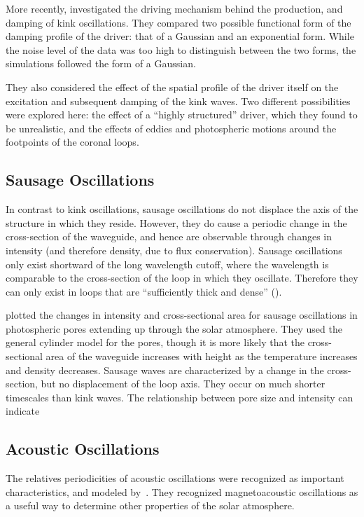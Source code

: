 \documentclass[preprint2]{aastex}
\begin{document}
More recently, \cite{kink_2} investigated the driving mechanism
behind the production, and damping of kink oscillations.
They compared two possible functional form of the damping profile
of the driver: that of a Gaussian and an exponential form.
While the noise level of the data was too high to distinguish
between the two forms, the simulations followed the form of a
Gaussian.

They also considered the effect of the spatial profile of the driver
itself on the excitation and subsequent damping of the kink
waves. Two different possibilities were explored here:
the effect of a ``highly structured'' driver, which they
found to be unrealistic, and the effects of eddies and photospheric
motions around the footpoints of the coronal loops.

\subsection{Sausage Oscillations}\label{sausage}
In contrast to kink oscillations, sausage oscillations do not displace
the axis of the structure in which they reside. However, they do cause
a periodic change in the cross-section of the waveguide, and hence
are observable through changes in intensity (and therefore density,
due to flux conservation). Sausage oscillations only exist shortward
of the long wavelength cutoff, where the wavelength is comparable to
the cross-section of the loop in which they oscillate. Therefore
they can only exist in loops that are ``sufficiently thick and dense''
(\cite{pfw_2}).

\cite{sausage_1} plotted the changes in intensity and cross-sectional
area for sausage oscillations in photospheric pores extending up
through the solar atmosphere. They used the general cylinder model for
the pores, though it is more likely that the cross-sectional area of
the waveguide increases with height as the temperature increases and
density decreases.
Sausage waves are characterized by a change in the cross-section,
but no displacement of the loop axis. They occur on much shorter
timescales than kink waves.
The relationship between pore size and intensity can
indicate


\subsection{Acoustic Oscillations}

The relatives periodicities of acoustic oscillations were recognized
as important characteristics, and modeled by~\cite{acoustic_1}.
They recognized magnetoacoustic oscillations as a useful way to determine
other properties of the solar atmosphere.
\end{document}

